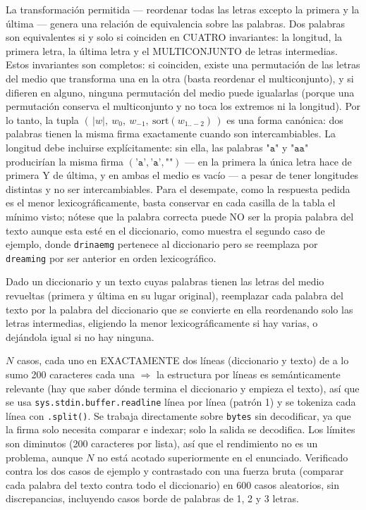  La transformación permitida — reordenar todas las letras excepto la primera y la última — genera una relación de equivalencia sobre las palabras. Dos palabras son equivalentes si y solo si coinciden en CUATRO invariantes: la longitud, la primera letra, la última letra y el MULTICONJUNTO de letras intermedias. Estos invariantes son completos: si coinciden, existe una permutación de las letras del medio que transforma una en la otra (basta reordenar el multiconjunto), y si difieren en alguno, ninguna permutación del medio puede igualarlas (porque una permutación conserva el multiconjunto y no toca los extremos ni la longitud). Por lo tanto, la tupla $(\,|w|,\ w_0,\ w_{-1},\ \mathrm{sort}(w_{1..-2})\,)$ es una forma canónica: dos palabras tienen la misma firma exactamente cuando son intercambiables. La longitud debe incluirse explícitamente: sin ella, las palabras $\texttt{"a"}$ y $\texttt{"aa"}$ producirían la misma firma $(\texttt{'a'},\texttt{'a'},\texttt{""})$ — en la primera la única letra hace de primera Y de última, y en ambas el medio es vacío — a pesar de tener longitudes distintas y no ser intercambiables. Para el desempate, como la respuesta pedida es el menor lexicográficamente, basta conservar en cada casilla de la tabla el mínimo visto; nótese que la palabra correcta puede NO ser la propia palabra del texto aunque esta esté en el diccionario, como muestra el segundo caso de ejemplo, donde \texttt{drinaemg} pertenece al diccionario pero se reemplaza por \texttt{dreaming} por ser anterior en orden lexicográfico.


Dado un diccionario y un texto cuyas palabras tienen las letras del medio revueltas (primera y última en su lugar original), reemplazar cada palabra del texto por la palabra del diccionario que se convierte en ella reordenando solo las letras intermedias, eligiendo la menor lexicográficamente si hay varias, o dejándola igual si no hay ninguna.

 $N$ casos, cada uno en EXACTAMENTE dos líneas (diccionario y texto) de a lo sumo 200 caracteres cada una $\Rightarrow$ la estructura por líneas es semánticamente relevante (hay que saber dónde termina el diccionario y empieza el texto), así que se usa \texttt{sys.stdin.buffer.readline} línea por línea (patrón 1) y se tokeniza cada línea con \texttt{.split()}. Se trabaja directamente sobre \texttt{bytes} sin decodificar, ya que la firma solo necesita comparar e indexar; solo la salida se decodifica. Los límites son diminutos (200 caracteres por lista), así que el rendimiento no es un problema, aunque $N$ no está acotado superiormente en el enunciado. Verificado contra los dos casos de ejemplo y contrastado con una fuerza bruta (comparar cada palabra del texto contra todo el diccionario) en 600 casos aleatorios, sin discrepancias, incluyendo casos borde de palabras de 1, 2 y 3 letras.

